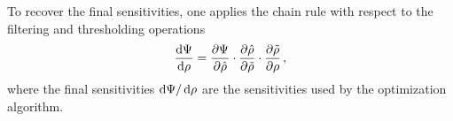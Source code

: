  To recover the final sensitivities, one applies the chain rule with respect to the filtering and thresholding operations
    \begin{equation}
 \frac{\mathop{}\!\text{d} \Psi}{\mathop{}\!\text{d} \rho} = \frac{\partial \Psi}{\partial \hat{\rho}} \cdot \frac{\partial \hat{\rho}}{\partial \tilde{\rho}} \cdot \frac{\partial \tilde{\rho}}{\partial \rho}\,,
    \end{equation}
 where the final sensitivities $\mathop{}\!\text{d} \Psi/\mathop{}\!\text{d} \rho$ are the sensitivities used by the optimization algorithm.



